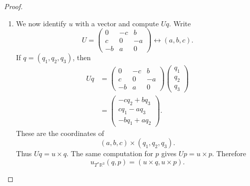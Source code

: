 \begin{proof}
\begin{enumerate}
More explicitly, let $A\in \text{SO}(3)$.
The cotangent lift is encoded by
$$
\xymatrix{
T^*\mathbb{R}^3 \ar[r]^{\widehat A}
\ar[d]_{\pi}
& T^*\mathbb{R}^3 \ar[d]^{\pi}\\
\mathbb{R}^3 \ar[r]_{A}
& \mathbb{R}^3
}
$$
and sends $(q,\xi)$ to $(Aq,A\cdot \xi)$,
where
$$
(A\cdot \xi)(v)=\xi(A^{-1}v).
$$
Use the Euclidean inner product to
identify covectors with vectors. Thus
write
$$
\xi(v)=\langle p,v\rangle.
$$
Here $p$ is the vector representing
$\xi$ by the Riesz representation
theorem.
By the definition of adjoint from
Definition \ref{linear-algebra-definition-adjoint},
we have
$$
\langle A^{-1}v,p\rangle
=\langle v,(A^{-1})^\dag p\rangle.
$$
Therefore
$$
\begin{aligned}
(A\cdot \xi)(v)
&=\xi(A^{-1}v)\\
&=\langle p,A^{-1}v\rangle\\
&=\langle A^{-1}v,p\rangle\\
&=\langle v,(A^{-1})^\dag p\rangle\\
&=\langle (A^{-1})^\dag p,v\rangle.
\end{aligned}
$$
Thus the covector $A\cdot \xi$ is
represented by $(A^{-1})^\dag p$.
Since $A\in\text{SO}(3)$, we have
$A^\dag=A^{-1}$, and hence
$(A^{-1})^\dag=A$. Therefore, after this
identification,
$$
A\cdot(q,p)=(Aq,Ap).
$$
It follows that, for
$u\in\mathfrak{so}(3)$,
$$
u_{T^*\mathbb{R}^3}(q,p)
=
\frac{d}{dt}\Big|_{t=0}
(e^{tu}q,e^{tu}p)
=(uq,up).
$$
\item We now identify $u$ with a vector
and compute $Uq$. Write
$$
U=
\begin{pmatrix}
0&-c&b\\
c&0&-a\\
-b&a&0
\end{pmatrix}
\longleftrightarrow (a,b,c).
$$
If $q=(q_1,q_2,q_3)$, then
\begin{align*}
Uq
&=
\begin{pmatrix}
0&-c&b\\
c&0&-a\\
-b&a&0
\end{pmatrix}
\begin{pmatrix}
q_1\\ q_2\\ q_3
\end{pmatrix}\\
&=
\begin{pmatrix}
-cq_2+bq_3\\
cq_1-aq_3\\
-bq_1+aq_2
\end{pmatrix}.
\end{align*}
These are the coordinates of
$$
(a,b,c)\times(q_1,q_2,q_3).
$$
Thus $Uq=u\times q$. The same computation
for $p$ gives $Up=u\times p$. Therefore
$$
u_{T^*\mathbb{R}^3}(q,p)
=(u\times q,u\times p).
$$


\end{enumerate}
\end{proof}
